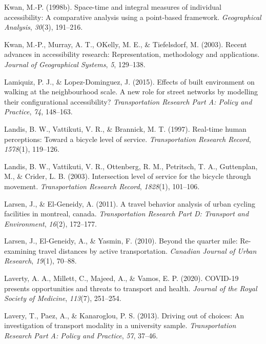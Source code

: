 \documentclass[
11pt, %
oneside, %
english, %
singlespacing, %
]{macthesis} %
\newlength{\cslhangindent}
\newenvironment{CSLReferences}[2] %
 {%
  \setlength{\parindent}{0pt}
  \ifodd #1 \everypar{\setlength{\hangindent}{\cslhangindent}}\ignorespaces\fi
  \ifnum #2 > 0
  \setlength{\parskip}{#2\baselineskip}
  \fi
 }%
 {}
\begin{document}
\begin{CSLReferences}{1}{0}
Kwan, M.-P. (1998b). Space-time and integral measures of individual accessibility: A comparative analysis using a point-based framework. \emph{Geographical Analysis}, \emph{30}(3), 191--216.

Kwan, M.-P., Murray, A. T., OKelly, M. E., \& Tiefelsdorf, M. (2003). Recent advances in accessibility research: Representation, methodology and applications. \emph{Journal of Geographical Systems}, \emph{5}, 129--138.

Lamiquiz, P. J., \& Lopez-Dominguez, J. (2015). Effects of built environment on walking at the neighbourhood scale. A new role for street networks by modelling their configurational accessibility? \emph{Transportation Research Part A: Policy and Practice}, \emph{74}, 148--163.

Landis, B. W., Vattikuti, V. R., \& Brannick, M. T. (1997). Real-time human perceptions: Toward a bicycle level of service. \emph{Transportation Research Record}, \emph{1578}(1), 119--126.

Landis, B. W., Vattikuti, V. R., Ottenberg, R. M., Petritsch, T. A., Guttenplan, M., \& Crider, L. B. (2003). Intersection level of service for the bicycle through movement. \emph{Transportation Research Record}, \emph{1828}(1), 101--106.

Larsen, J., \& El-Geneidy, A. (2011). A travel behavior analysis of urban cycling facilities in montreal, canada. \emph{Transportation Research Part D: Transport and Environment}, \emph{16}(2), 172--177.

Larsen, J., El-Geneidy, A., \& Yasmin, F. (2010). Beyond the quarter mile: Re-examining travel distances by active transportation. \emph{Canadian Journal of Urban Research}, \emph{19}(1), 70--88.

Laverty, A. A., Millett, C., Majeed, A., \& Vamos, E. P. (2020). COVID-19 presents opportunities and threats to transport and health. \emph{Journal of the Royal Society of Medicine}, \emph{113}(7), 251--254.

Lavery, T., Paez, A., \& Kanaroglou, P. S. (2013). Driving out of choices: An investigation of transport modality in a university sample. \emph{Transportation Research Part A: Policy and Practice}, \emph{57}, 37--46.


\end{CSLReferences}
\end{document}
